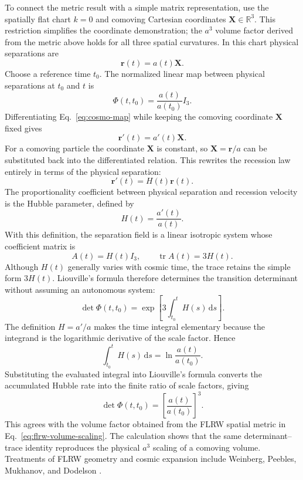 \documentclass[11pt,a4paper]{article}
\newcommand{\be}{\begin{equation}}
\newcommand{\ee}{\end{equation}}
\newcommand{\lb}[1]{\label{#1}}
\newcommand{\dd}{\mathrm{d}}
\newcommand{\R}{\mathbb{R}}
\DeclareMathOperator{\tr}{tr}
\theoremstyle{definition}
\numberwithin{equation}{section}
\begin{document}
To connect the metric result with a simple matrix representation, use the spatially flat chart $k=0$ and comoving Cartesian coordinates $\mathbf{X}\in\R^3$. This restriction simplifies the coordinate demonstration; the $a^3$ volume factor derived from the metric above holds for all three spatial curvatures. In this chart physical separations are
\be
\mathbf{r}(t)=a(t)\mathbf{X}.
\lb{eq:cosmo-map}
\ee
Choose a reference time $t_0$. The normalized linear map between physical separations at $t_0$ and $t$ is
\be
\Phi(t,t_0)
=
\frac{a(t)}{a(t_0)}I_3.
\lb{eq:cosmo-transition}
\ee
Differentiating Eq.~\eqref{eq:cosmo-map} while keeping the comoving coordinate $\mathbf{X}$ fixed gives
\be
\mathbf{r}'(t)=a'(t)\mathbf{X}.
\lb{eq:cosmo-derivative1}
\ee
For a comoving particle the coordinate $\mathbf X$ is constant, so $\mathbf X=\mathbf r/a$ can be substituted back into the differentiated relation. This rewrites the recession law entirely in terms of the physical separation:
\be
\mathbf{r}'(t)=H(t)\mathbf{r}(t).
\lb{eq:hubble-flow}
\ee
The proportionality coefficient between physical separation and recession velocity is the Hubble parameter, defined by
\be
H(t)=\frac{a'(t)}{a(t)}.
\lb{eq:hubble-parameter}
\ee
With this definition, the separation field is a linear isotropic system whose coefficient matrix is
\be
A(t)=H(t)I_3,
\qquad
\tr A(t)=3H(t).
\lb{eq:cosmo-A}
\ee
Although $H(t)$ generally varies with cosmic time, the trace retains the simple form $3H(t)$. Liouville's formula therefore determines the transition determinant without assuming an autonomous system:
\be
\det\Phi(t,t_0)
=
\exp\left[
3\int_{t_0}^{t}H(s)\,\dd s
\right].
\lb{eq:cosmo-liouville1}
\ee
The definition $H=a'/a$ makes the time integral elementary because the integrand is the logarithmic derivative of the scale factor. Hence
\be
\int_{t_0}^{t}H(s)\,\dd s
=
\ln\frac{a(t)}{a(t_0)}.
\lb{eq:cosmo-H-integral}
\ee
Substituting the evaluated integral into Liouville's formula converts the accumulated Hubble rate into the finite ratio of scale factors, giving
\be
\det\Phi(t,t_0)
=
\left[
\frac{a(t)}{a(t_0)}
\right]^3.
\lb{eq:cosmo-liouville2}
\ee
This agrees with the volume factor obtained from the FLRW spatial metric in Eq.~\eqref{eq:flrw-volume-scaling}. The calculation shows that the same determinant--trace identity reproduces the physical $a^3$ scaling of a comoving volume. Treatments of FLRW geometry and cosmic expansion include Weinberg, Peebles, Mukhanov, and Dodelson \cite{weinberg2008,peebles1993,mukhanov2005,dodelson2003}.
\end{document}
